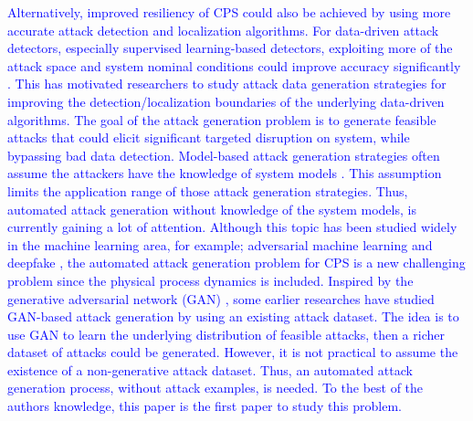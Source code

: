  \textcolor{blue}{Alternatively, improved resiliency of CPS could also be achieved by using more accurate attack detection and localization algorithms. For data-driven attack detectors, especially supervised learning-based detectors, exploiting more of the attack space and system nominal conditions could improve accuracy significantly \cite{sayghe2020survey}. This has motivated researchers to study attack data generation strategies for improving the detection/localization boundaries of the underlying data-driven algorithms. The goal of the attack generation problem is to generate feasible attacks that could elicit significant targeted disruption on system, while bypassing bad data detection. Model-based attack generation strategies often assume the attackers have the knowledge of system models \cite{liu2011false,mo2010false}. This assumption limits the application range of those attack generation strategies. Thus, automated attack generation without knowledge of the system models, is currently gaining a lot of attention. Although this topic has been studied widely in the machine learning area, for example; adversarial machine learning \cite{huang2011adversarial} and deepfake \cite{westerlund2019emergence}, the automated attack generation problem for CPS is a new challenging problem since the physical process dynamics is included. Inspired by the generative adversarial network (GAN) \cite{goodfellow2014generative}, some earlier researches \cite{mohammadpourfard2020generation, ahmadian2018cyber, shahriar2021iattackgen} have studied GAN-based attack generation by using an existing attack dataset. The idea is to use GAN to learn the underlying distribution of feasible attacks, then a richer dataset of attacks could be generated. However, it is not practical to assume the existence of a non-generative attack dataset. Thus, an automated attack generation process, without attack examples, is needed. To the best of the authors knowledge, this paper is the first paper to study this problem.}
 



